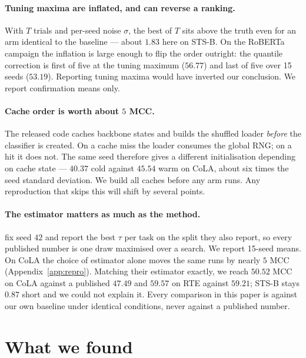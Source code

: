 \documentclass{article}
\begin{document}
\paragraph{Tuning maxima are inflated, and can reverse a ranking.} With $T$
trials and per-seed noise $\sigma$, the best of $T$ sits above the truth even
for an arm identical to the baseline --- about $1.83$ here on STS-B. On the
RoBERTa campaign the inflation is large enough to flip the order outright: the
quantile correction is first of five at the tuning maximum ($56.77$) and last
of five over 15 seeds ($53.19$). Reporting tuning maxima would have inverted our
conclusion. We report confirmation means only.

\paragraph{Cache order is worth about $5$ MCC.} The released code caches
backbone states and builds the shuffled loader \emph{before} the classifier is
created. On a cache miss the loader consumes the global RNG; on a hit it does
not. The same seed therefore gives a different initialisation depending on cache
state --- $40.37$ cold against $45.54$ warm on CoLA, about six times the seed
standard deviation. We build all caches before any arm runs. Any reproduction
that skips this will shift by several points.

\paragraph{The estimator matters as much as the method.} \citet{mantri2026glot}
fix seed $42$ and report the best $\tau$ per task on the split they also report,
so every published number is one draw maximised over a search. We report 15-seed
means. On CoLA the choice of estimator alone moves the same runs by nearly $5$
MCC (Appendix~\ref{app:repro}). Matching their estimator exactly, we reach
$50.52$ MCC on CoLA against a published $47.49$ and $59.57$ on RTE against
$59.21$; STS-B stays $0.87$ short and we could not explain it. Every comparison
in this paper is against our own baseline under identical conditions, never
against a published number.

\section{What we found}
\label{sec:results}
\end{document}
